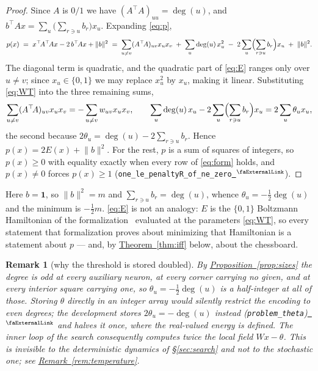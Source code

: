 \documentclass{easychair}
\newtheorem{remark}[thm]{Remark}
\newcommand{\secref}[1]{\hyperref[#1]{\textcolor{academicpurple}{\S\ref*{#1}}}}
\newcommand{\citeref}[1]{\textcolor{academicpurple}{\cite{#1}}}
\newcommand{\thmref}[1]{\textcolor{academicpurple}{\hyperref[#1]{Theorem~\ref*{#1}}}}
\newcommand{\propref}[1]{\textcolor{academicpurple}{\hyperref[#1]{Proposition~\ref*{#1}}}}
\newcommand{\remref}[1]{\textcolor{academicpurple}{\hyperref[#1]{Remark~\ref*{#1}}}}
\newcommand{\extlink}{~\ensuremath{{}^\text{\faExternalLink}}}
\newcommand{\repoowner}{mkaratarakis/HNBM}
\newcommand{\reporef}{1bd91612ee31180f6c99fa11090b713f3012ead4}
\newcommand{\repo}{https://github.com/\repoowner/blob/\reporef}
\newcommand{\srcl}[2]{\href{\repo/#1\#L#2}{\extlink}}
\newcommand{\qsrc}[2]{\srcl{HopfieldNet/QUBO/Instances/Queens/#1}{#2}}
\newcommand{\qusrc}[2]{\srcl{HopfieldNet/QUBO/#1}{#2}}
\begin{document}
\begin{proof}
Since $A$ is $0/1$ we have $(A^{\top}\!A)_{uu} = \deg(u)$, and
$b^{\top}\!Ax = \sum_u\bigl(\sum_{r \ni u} b_r\bigr)x_u$. Expanding \eqref{eq:p},
\[
  p(x) \;=\; x^{\top}\!A^{\top}\!Ax - 2\,b^{\top}\!Ax + \lVert b\rVert^2
       \;=\; \sum_{u \ne v}(A^{\top}\!A)_{uv}x_ux_v \;+\; \sum_u \deg(u)\,x_u^{2}
             \;-\; 2\sum_u\Bigl(\sum_{r \ni u}b_r\Bigr)x_u \;+\; \lVert b\rVert^2 .
\]
The diagonal term is quadratic, and the quadratic part of \eqref{eq:E} ranges only over $u \ne v$;
since $x_u \in \{0,1\}$ we may replace $x_u^{2}$ by $x_u$, making it linear. Substituting
\eqref{eq:WT} into the three remaining sums,
\[
  \sum_{u \ne v}(A^{\top}\!A)_{uv}x_ux_v = -\sum_{u \ne v}w_{uv}x_ux_v ,
  \qquad
  \sum_u \deg(u)\,x_u - 2\sum_u\Bigl(\sum_{r \ni u}b_r\Bigr)x_u = 2\sum_u \theta_u x_u ,
\]
the second because $2\theta_u = \deg(u) - 2\sum_{r \ni u}b_r$. Hence
$p(x) = 2E(x) + \lVert b\rVert^2$. For the rest, $p$ is a sum of squares of integers, so
$p(x) \ge 0$ with equality exactly when every row of \eqref{eq:form} holds, and $p(x) \ne 0$ forces
$p(x) \ge 1$ (\lstinline{one_le_penaltyR_of_ne_zero}\qusrc{Minimizers.lean}{84}).
\end{proof}

Here $b = \mathbf{1}$, so $\lVert b\rVert^2 = m$ and $\sum_{r \ni u}b_r = \deg(u)$, whence
$\theta_u = -\tfrac12\deg(u)$ and the minimum is $-\tfrac12 m$. \eqref{eq:E} is not an analogy:
$E$ is the $\{0,1\}$ Boltzmann Hamiltonian of the formalization~\citeref{hnbm} evaluated at the
parameters \eqref{eq:WT}, so every statement that formalization proves about minimizing that
Hamiltonian is a statement about $p$ --- and, by \thmref{thm:iff} below, about the chessboard.

\begin{remark}[why the threshold is stored doubled]\label{rem:doubling}
By \propref{prop:sizes} the degree is odd at every auxiliary neuron, at every corner carrying no
given, and at every interior square carrying one, so $\theta_u = -\tfrac12\deg(u)$ is a
half-integer at all of those. Storing $\theta$ directly in an integer array
would silently restrict the encoding to even degrees; the development stores $2\theta_u = -\deg(u)$
instead (\lstinline{problem_theta})\qsrc{Basic.lean}{475} and halves it once, where the real-valued
energy is defined. The inner loop of the search
consequently computes twice the local field $Wx - \theta$. This is invisible to the deterministic
dynamics of \secref{sec:search} and not to the stochastic one; see \remref{rem:temperature}.
\end{remark}
\end{document}
